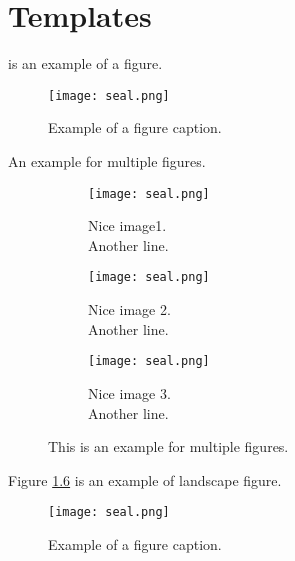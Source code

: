 \chapter{Templates}


\begin{tempsection}
     is an example of a figure.
    \begin{figure}[htbp]
        \centerline{\texttt{[image: seal.png]}}
        \caption{Example of a figure caption.}
        \label{fig}
    \end{figure}

    An example for multiple figures.
    \begin{figure}[htbp]
        \centering
        \begin{subfigure}{0.31\columnwidth}
            \centering
            \texttt{[image: seal.png]}
            \caption{Nice image1. \\ Another line.}
            \label{fig:multiple_figures_a}
        \end{subfigure}
        \begin{subfigure}{0.31\columnwidth}
            \centering
            \texttt{[image: seal.png]}
            \caption{Nice image 2. \\ Another line.}
            \label{fig:multiple_figures_b}
        \end{subfigure}
        \begin{subfigure}{0.31\columnwidth}
            \centering
            \texttt{[image: seal.png]}
            \caption{Nice image 3. \\ Another line.}
            \label{fig:multiple_figures_c}
        \end{subfigure}
        \caption{This is an example for multiple figures.}
        \label{fig:multiple_figures}
    \end{figure}

    Figure \ref{fig2} is an example of landscape figure.
    \begin{landscape}
        \begin{figure}[htbp]
            \centerline{\texttt{[image: seal.png]}}
            \caption{Example of a figure caption.}
            \label{fig2}
        \end{figure}
    \end{landscape}


\end{tempsection}
